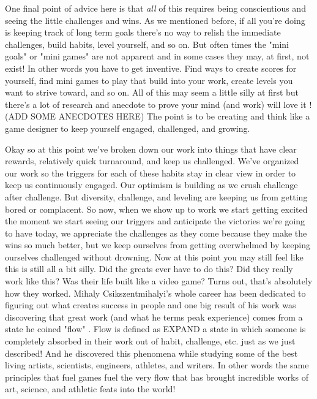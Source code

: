 \documentclass[11pt,a5paper]{book}
\begin{document}
One final point of advice here is that \textit{all} of this requires being conscientious and seeing the little challenges and wins. As we mentioned before, if all you're doing is keeping track of long term goals there's no way to relish the immediate challenges, build habits, level yourself, and so on. But often times the "mini goals" or "mini games" are not apparent and in some cases they may, at first, not exist! In other words you have to get inventive. Find ways to create scores for yourself, find mini games to play that build into your work, create levels you want to strive toward, and so on. All of this may seem a little silly at first but there's a lot of research and anecdote to prove your mind (and work) will love it \cite{superbetter}! (ADD SOME ANECDOTES HERE) The point is to be creating and think like a game designer to keep yourself engaged, challenged, and growing. 
\newline

Okay so at this point we've broken down our work into things that have clear rewards, relatively quick turnaround, and keep us challenged. We've organized our work so the triggers for each of these habits stay in clear view in order to keep us continuously engaged. Our optimism is building as we crush challenge after challenge. But diversity, challenge, and leveling are keeping us from getting bored or complacent. So now, when we show up to work we start getting excited the moment we start seeing our triggers and anticipate the victories we're going to have today, we appreciate the challenges as they come because they make the wins so much better, but we keep ourselves from getting overwhelmed by keeping ourselves challenged without drowning. Now at this point you may still feel like this is still all a bit silly. Did the greats ever have to do this? Did they really work like this? Was their life built like a video game? Turns out, that's absolutely how they worked. Mihaly Csikszentmihalyi's whole career has been dedicated to figuring out what creates success in people and one big result of his work was discovering that great work (and what he terms peak experience) comes from a state he coined "flow" \cite{flow}. Flow is defined as EXPAND a state in which someone is completely absorbed in their work out of habit, challenge, etc. just as we just described! And he discovered this phenomena while studying some of the best living artists, scientists, engineers, athletes, and writers. In other words the same principles that fuel games fuel the very flow that has brought incredible works of art, science, and athletic feats into the world! 
\newline
\end{document}

